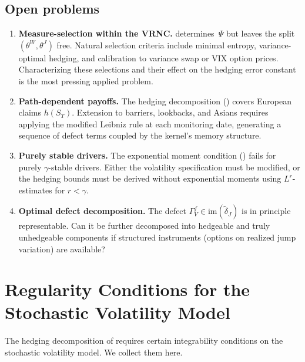 \documentclass[11pt,a4paper]{article}
\theoremstyle{plain}
\theoremstyle{definition}
\theoremstyle{remark}
\begin{document}
\subsection{Open problems}

\begin{enumerate}[label=(\roman*)]
\item \textbf{Measure-selection within the VRNC.}
   determines~$\Psi$ but leaves the
  split $(\theta^W, \theta^J)$ free.
  Natural selection criteria include minimal entropy,
  variance-optimal hedging, and calibration to variance swap
  or VIX option prices.  Characterizing these selections and
  their effect on the hedging error constant is the most
  pressing applied problem.

\item \textbf{Path-dependent payoffs.}
  The hedging decomposition ()
  covers European claims $h(S_T)$.  Extension to barriers,
  lookbacks, and Asians requires applying the modified Leibniz
  rule at each monitoring date,
  generating a sequence of defect terms coupled by the
  kernel's memory structure.

\item \textbf{Purely stable drivers.}
  The exponential moment condition ()
  fails for purely $\gamma$-stable drivers.
  Either the volatility specification must be modified, or
  the hedging bounds must be derived without exponential
  moments using $L^r$-estimates for $r < \gamma$.

\item \textbf{Optimal defect decomposition.}
  The defect $\Gamma_V^f \in \mathrm{im}(\widetilde{\delta}_J)$
  is in principle representable.  Can it be further decomposed
  into hedgeable and truly unhedgeable components if structured
  instruments (options on realized jump variation) are available?
\end{enumerate}


\appendix
\section{Regularity Conditions for the Stochastic Volatility
  Model}\label{app:regularity}

The hedging decomposition of  requires
certain integrability conditions on the stochastic
volatility model.  We collect them here.
\end{document}
